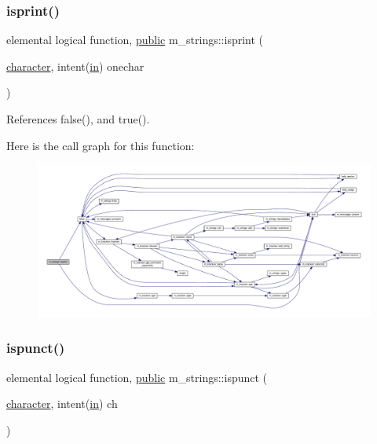 \subsubsection{\texorpdfstring{isprint()}{isprint()}}
{\footnotesize\ttfamily elemental logical function, \hyperlink{M__stopwatch_83_8txt_a2f74811300c361e53b430611a7d1769f}{public} m\+\_\+strings\+::isprint (\begin{DoxyParamCaption}\item[{\hyperlink{option__stopwatch_83_8txt_abd4b21fbbd175834027b5224bfe97e66}{character}, intent(\hyperlink{M__journal_83_8txt_afce72651d1eed785a2132bee863b2f38}{in})}]{onechar }\end{DoxyParamCaption})}



References false(), and true().

Here is the call graph for this function\+:
\nopagebreak
\begin{figure}[H]
\begin{center}
\leavevmode
\includegraphics[width=350pt]{namespacem__strings_a267f2fde729a75496c82a64754a91e54_cgraph}
\end{center}
\end{figure}
\mbox{\label{namespacem__strings_a8712164e1f5fd717bdea854a3f067619}} 
\subsubsection{\texorpdfstring{ispunct()}{ispunct()}}
{\footnotesize\ttfamily elemental logical function, \hyperlink{M__stopwatch_83_8txt_a2f74811300c361e53b430611a7d1769f}{public} m\+\_\+strings\+::ispunct (\begin{DoxyParamCaption}\item[{\hyperlink{option__stopwatch_83_8txt_abd4b21fbbd175834027b5224bfe97e66}{character}, intent(\hyperlink{M__journal_83_8txt_afce72651d1eed785a2132bee863b2f38}{in})}]{ch }\end{DoxyParamCaption})}



